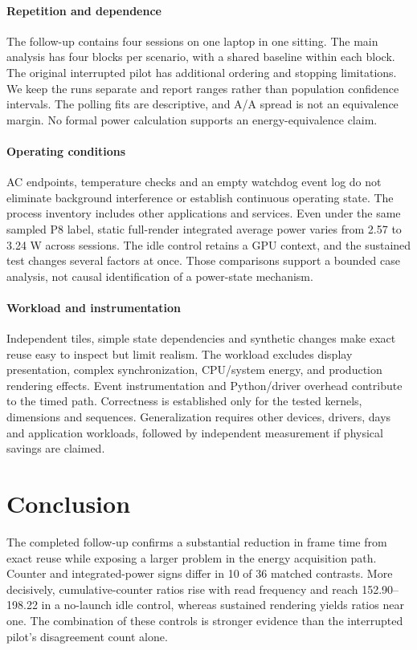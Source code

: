 \documentclass[10pt,conference]{IEEEtran}
\begin{document}
\paragraph{Repetition and dependence}
The follow-up contains four sessions on one laptop in one sitting. The main analysis has four blocks per scenario, with a shared baseline within each block. The original interrupted pilot has additional ordering and stopping limitations. We keep the runs separate and report ranges rather than population confidence intervals. The polling fits are descriptive, and A/A spread is not an equivalence margin. No formal power calculation supports an energy-equivalence claim.

\paragraph{Operating conditions}
AC endpoints, temperature checks and an empty watchdog event log do not eliminate background interference or establish continuous operating state. The process inventory includes other applications and services. Even under the same sampled P8 label, static full-render integrated average power varies from 2.57 to 3.24 W across sessions. The idle control retains a GPU context, and the sustained test changes several factors at once. Those comparisons support a bounded case analysis, not causal identification of a power-state mechanism.

\paragraph{Workload and instrumentation}
Independent tiles, simple state dependencies and synthetic changes make exact reuse easy to inspect but limit realism. The workload excludes display presentation, complex synchronization, CPU/system energy, and production rendering effects. Event instrumentation and Python/driver overhead contribute to the timed path. Correctness is established only for the tested kernels, dimensions and sequences. Generalization requires other devices, drivers, days and application workloads, followed by independent measurement if physical savings are claimed.

\section{Conclusion}
The completed follow-up confirms a substantial reduction in frame time from exact reuse while exposing a larger problem in the energy acquisition path. Counter and integrated-power signs differ in 10 of 36 matched contrasts. More decisively, cumulative-counter ratios rise with read frequency and reach 152.90--198.22 in a no-launch idle control, whereas sustained rendering yields ratios near one. The combination of these controls is stronger evidence than the interrupted pilot's disagreement count alone.
\end{document}
